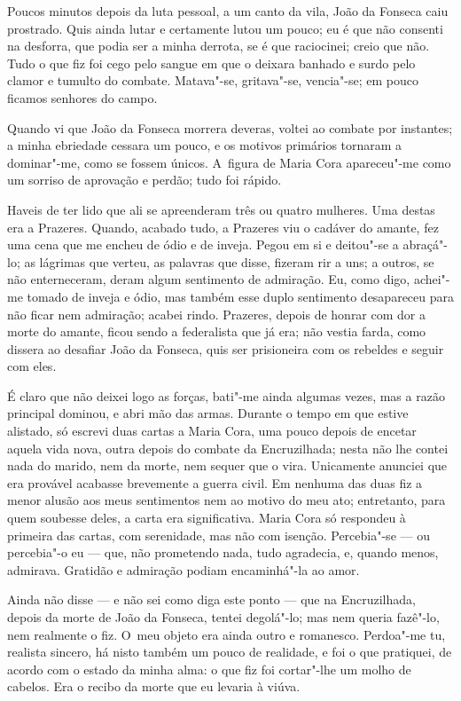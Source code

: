 \begin{linenumbers}
Poucos minutos depois da luta pessoal, a um canto da vila, João da
Fonseca caiu prostrado. Quis ainda lutar e certamente lutou um pouco; eu
é que não consenti na desforra, que podia ser a minha derrota, se é que
raciocinei; creio que não. Tudo o que fiz foi cego pelo sangue em que o
deixara banhado e surdo pelo clamor e tumulto do combate. Matava"-se,
gritava"-se, vencia"-se; em pouco ficamos senhores do campo.

Quando vi que João da Fonseca morrera deveras, voltei ao combate por
instantes; a minha ebriedade cessara um pouco, e os motivos primários
tornaram a dominar"-me, como se fossem únicos. A~figura de Maria Cora
apareceu"-me como um sorriso de aprovação e perdão; tudo foi rápido.

Haveis de ter lido que ali se apreenderam três ou quatro mulheres. Uma
destas era a Prazeres. Quando, acabado tudo, a Prazeres viu o cadáver do
amante, fez uma cena que me encheu de ódio e de inveja. Pegou em si e
deitou"-se a abraçá"-lo; as lágrimas que verteu, as palavras que disse,
fizeram rir a uns; a outros, se não enterneceram, deram algum sentimento
de admiração. Eu, como digo, achei"-me tomado de inveja e ódio, mas
também esse duplo sentimento desapareceu para não ficar nem admiração;
acabei rindo. Prazeres, depois de honrar com dor a morte do amante,
ficou sendo a federalista que já era; não vestia farda, como dissera ao
desafiar João da Fonseca, quis ser prisioneira com os rebeldes e seguir
com eles.

É claro que não deixei logo as forças, bati"-me ainda algumas vezes, mas
a razão principal dominou, e abri mão das armas. Durante o tempo em que
estive alistado, só escrevi duas cartas a Maria Cora, uma pouco depois
de encetar aquela vida nova, outra depois do combate da Encruzilhada;
nesta não lhe contei nada do marido, nem da morte, nem sequer que o
vira. Unicamente anunciei que era provável acabasse brevemente a guerra
civil. Em nenhuma das duas fiz a menor alusão aos meus sentimentos nem
ao motivo do meu ato; entretanto, para quem soubesse deles, a carta era
significativa. Maria Cora só respondeu à primeira das cartas, com
serenidade, mas não com isenção. Percebia"-se --- ou percebia"-o eu --- que,
não prometendo nada, tudo agradecia, e, quando menos, admirava. Gratidão
e admiração podiam encaminhá"-la ao amor.

Ainda não disse --- e não sei como diga este ponto --- que na
Encruzilhada, depois da morte de João da Fonseca, tentei degolá"-lo; mas
nem queria fazê"-lo, nem realmente o fiz. O~meu objeto era ainda outro e
romanesco. Perdoa"-me tu, realista sincero, há nisto também um pouco de
realidade, e foi o que pratiquei, de acordo com o estado da minha alma:
o que fiz foi cortar"-lhe um molho de cabelos. Era o recibo da morte que
eu levaria à viúva.


\end{linenumbers}

